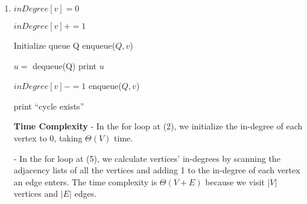 \documentclass[a4paper]{report}
\begin{document}
\begin{enumerate}
    Case 2: If the algorithm discovers that the graph is cyclic, it has found a back edge. The algorithm stops before 
    checking at most $|V|$ edges. 
    Together with DFS' time complexity of $\Theta(|V| + |E|)$, this case's time complexity is $O(V)$. 

    Therefore, the algorithm's time complexity is $O(V)$ because $O$ in Case 2 is less strict than $\Theta$ in Case 1. 

    -----

    \pagebreak
    \par
    \bigskip

    Pseudocode for Topological Sort:

    \item
      \begin{algorithmic}[1]
          \State $inDegree[v]=0$
        \EndFor

            \State $inDegree[v]+=1$
          \EndFor
        \EndFor

        \State Initialize queue Q
            \State enqueue($Q,v$)
          \EndIf
        \EndFor


          \State $u =$ dequeue(Q)
          \State print $u$

            \State $inDegree[v] -= 1$
              \State enqueue($Q,v$)
            \EndIf
          \EndFor
        \EndWhile

            \State print ``cycle exists''
          \EndIf
        \EndFor
      \EndFunction
      \end{algorithmic}

      {\bf Time Complexity}
      - In the for loop at (2), we initialize the in-degree of each vertex to 0, taking $\Theta(V)$ time. 

      - In the for loop at (5), we calculate vertices' in-degrees by scanning the adjacency lists of all the vertices and
      adding 1 to the in-degree of each vertex an edge enters. The time complexity is $\Theta(V+E)$ because we visit
      $|V|$ vertices and $|E|$ edges.


\end{enumerate}
\end{document}
